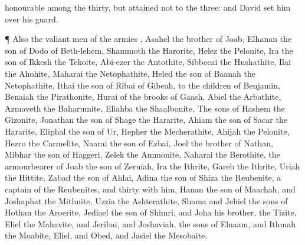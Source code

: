 {honourable among the
thirty, but
attained not to the
{}
three: and
David
set him over his
guard.
\par }{\PP {}¶ Also the valiant
men of the
armies
{},
Asahel the
brother of
Joab,
Elhanan the
son of
Dodo of
Beth-lehem,
Shammoth the
Harorite,
Helez the
Pelonite,
Ira the
son of
Ikkesh the
Tekoite,
Abi-ezer the
Antothite,
Sibbecai the
Hushathite,
Ilai the
Ahohite,
Maharai the
Netophathite,
Heled the
son of
Baanah the
Netophathite,
Ithai the
son of
Ribai of
Gibeah,
{} to the
children of
Benjamin,
Benaiah the
Pirathonite,
Hurai of the
brooks of
Gaash,
Abiel the
Arbathite,
Azmaveth the
Baharumite,
Eliahba the
Shaalbonite,
The
sons of
Hashem the
Gizonite,
Jonathan the
son of
Shage the
Hararite,
Ahiam the
son of
Sacar the
Hararite,
Eliphal the
son of
Ur,
Hepher the
Mecherathite,
Ahijah the
Pelonite,
Hezro the
Carmelite,
Naarai the
son of
Ezbai,
Joel the
brother of
Nathan,
Mibhar the
son of
Haggeri,
Zelek the
Ammonite,
Naharai the
Berothite, the
armourbearer of
Joab the
son of
Zeruiah,
Ira the
Ithrite,
Gareb the
Ithrite,
Uriah the
Hittite,
Zabad the
son of
Ahlai,
Adina the
son of
Shiza the
Reubenite, a
captain of the
Reubenites, and
thirty with him,
Hanan the
son of
Maachah, and
Joshaphat the
Mithnite,
Uzzia the
Ashterathite,
Shama and
Jehiel the
sons of
Hothan the
Aroerite,
Jediael the
son of
Shimri, and
Joha his
brother, the
Tizite,
Eliel the
Mahavite, and
Jeribai, and
Joshaviah, the
sons of
Elnaam, and
Ithmah the
Moabite,
Eliel, and
Obed, and
Jasiel the
Mesobaite.

}
